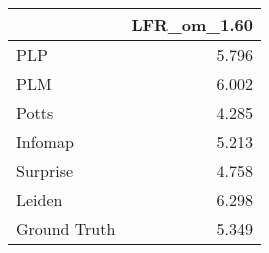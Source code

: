 \begin{tabular}{lr}
\toprule
{} & LFR_om_1.60 \\
\midrule
PLP          &       5.796 \\
PLM          &       6.002 \\
Potts        &       4.285 \\
Infomap      &       5.213 \\
Surprise     &       4.758 \\
Leiden       &       6.298 \\
Ground Truth &       5.349 \\
\bottomrule
\end{tabular}

